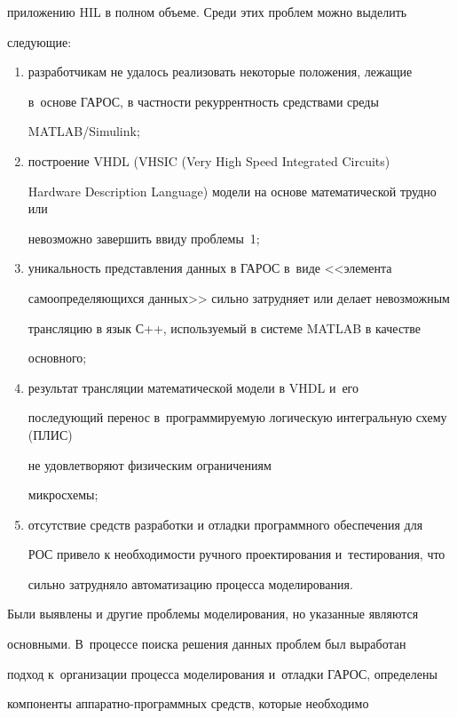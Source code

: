 приложению HIL в полном объеме. Среди этих проблем можно выделить 

следующие:

  \begin{enumerate}[(1)]

\item разработчикам не удалось реализовать некоторые положения, лежащие 

в~основе ГАРОС, в частности рекуррентность средствами среды 

\mbox{MATLAB}/Simulink;

\item построение VHDL (VHSIC (Very High Speed Integrated Circuits)

Hardware Description Language) модели на основе математической трудно или 

невозможно завершить ввиду проблемы~1;

\item уникальность представления данных в ГАРОС в~виде <<элемента 

самоопределяющихся данных>> сильно затрудняет или делает невозможным 

трансляцию в язык С++, используемый в системе MATLAB в качестве 

основного;

\item результат трансляции математической модели в VHDL и~его 

последующий перенос в~программируемую логическую интегральную схему (ПЛИС) 

не удовлетворяют физическим ограничениям 

микросхемы;

\item отсутствие средств разработки и отладки программного обеспечения для 

РОС привело к необходимости ручного проектирования и~тестирования, что 

сильно затрудняло автоматизацию процесса моделирования.

\end{enumerate}



  Были выявлены и другие проблемы моделирования, но указанные являются 

основными. В~процессе поиска решения данных проблем был выработан 

подход к~организации процесса моделирования и~отладки ГАРОС, определены 

компоненты ап\-па\-рат\-но-про\-граммных средств, которые необходимо 

